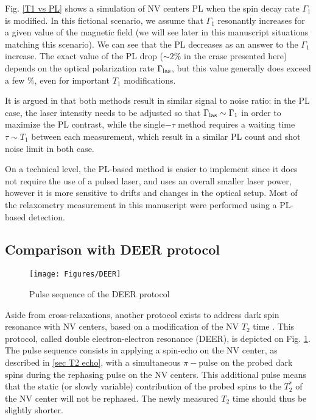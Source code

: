 \documentclass[a4paper,11pt]{report}
\begin{document}
 Fig. \ref{T1 vs PL} shows a simulation of NV centers PL when the spin decay rate $\Gamma_1$ is modified. In this fictional scenario, we assume that $\Gamma_1$ resonantly increases for a given value of the magnetic field (we will see later in this manuscript situations matching this scenario). We can see that the PL decreases as an answer to the $\Gamma_1$ increase. The exact value of the PL drop ($\sim 2\%$ in the crase presented here) depends on the optical polarization rate $\Gamma_{\rm las}$, but this value generally does exceed a few \%, even for important $T_1$ modifications.

It is argued in \citep{finco2021imaging} that both methods result in similar signal to noise ratio: in the PL case, the laser intensity needs to be adjusted so that $\Gamma_{\rm las} \sim \Gamma_1$ in order to maximize the PL contrast, while the single$-\tau$ method requires a waiting time $\tau \sim T_1$ between each measurement, which result in a similar PL count and shot noise limit in both case.

On a technical level, the PL-based method is easier to implement since it does not require the use of a pulsed laser, and uses an overall smaller laser power, however it is more sensitive to drifts and changes in the optical setup. Most of the relaxometry measurement in this manuscript were performed using a PL-based detection.

\subsection{Comparison with DEER protocol}

\begin{figure}[h]
\centering
\texttt{[image: Figures/DEER]}
\caption{Pulse sequence of the DEER protocol}
\label{DEER}
\end{figure}

Aside from cross-relaxations, another protocol exists to address dark spin resonance with NV centers, based on a modification of the NV $T_2$ time \citep{mamin2012detecting, serbyn2014interferometric}. This protocol, called double electron-electron resonance (DEER), is depicted on Fig. \ref{DEER}. The pulse sequence consists in applying a spin-echo on the NV center, as described in \ref{sec T2 echo}, with a simultaneous $\pi-$pulse on the probed dark spins during the rephasing pulse on the NV centers. This additional pulse means that the static (or slowly variable) contribution of the probed spins to the $T_2^*$ of the NV center will not be rephased. The newly measured $T_2$ time should thus be slightly shorter.
\end{document}
